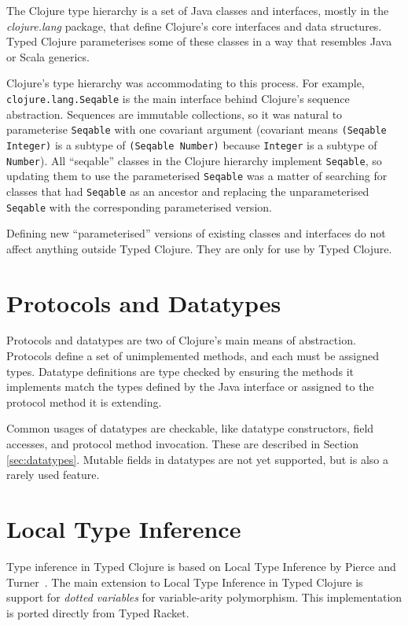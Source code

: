 The Clojure type hierarchy is a set of Java classes and interfaces, mostly in the
\emph{clojure.lang} package, that define Clojure's core 
interfaces and data structures.
Typed Clojure parameterises some of these classes in a way that resembles
Java or Scala generics.

Clojure's type hierarchy was accommodating to this process.
For example, \lstinline{clojure.lang.Seqable} is the main interface behind
Clojure's sequence abstraction. Sequences are immutable collections,
so it was natural to parameterise \lstinline{Seqable} with one covariant
argument (covariant means \lstinline|(Seqable Integer)| is
a subtype of \lstinline|(Seqable Number)| because \lstinline|Integer|
is a subtype of \lstinline|Number|).
All ``seqable'' classes in the Clojure hierarchy implement \lstinline|Seqable|,
so updating them to use the parameterised \lstinline|Seqable| was a matter of
searching for classes that had \lstinline|Seqable| as an ancestor and replacing
the unparameterised \lstinline|Seqable| with the corresponding parameterised 
version.

Defining new ``parameterised'' versions of existing classes and interfaces do 
not affect anything outside Typed Clojure.
They are only for use by Typed Clojure.

\section{Protocols and Datatypes}

Protocols and datatypes are two of Clojure's main means of abstraction.
Protocols define a set of unimplemented methods, and each must be assigned types.
Datatype definitions are type checked by ensuring the methods it
implements match the types defined by the Java interface or assigned to the protocol method
it is extending.

Common usages of datatypes are checkable, like datatype
constructors, field accesses, and protocol method invocation.
These are described in Section \ref{sec:datatypes}.
Mutable fields in datatypes are not yet supported, but is
also a rarely used feature.

\section{Local Type Inference}

Type inference in Typed Clojure is based on Local Type Inference
by Pierce and Turner~\cite{PT00}.
The main extension to Local Type Inference in Typed Clojure
is support for \emph{dotted variables} for variable-arity polymorphism.
This implementation is ported directly from Typed Racket.

